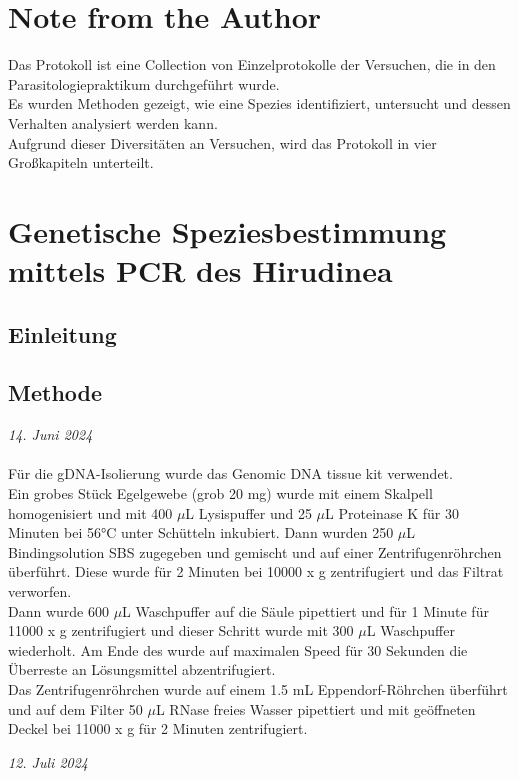 \documentclass[oneside,10pt,a4paper]{report}
\begin{document}
	
	\tableofcontents
	\chapter{Note from the Author}
	Das Protokoll ist eine Collection von Einzelprotokolle der Versuchen, die in den Parasitologiepraktikum durchgeführt wurde.\\
	Es wurden Methoden gezeigt, wie eine Spezies identifiziert, untersucht und dessen Verhalten analysiert werden kann.\\
	Aufgrund dieser Diversitäten an Versuchen, wird das Protokoll in vier Großkapiteln unterteilt.
	
	
	\chapter{Genetische Speziesbestimmung mittels PCR des Hirudinea}	
	\section{Einleitung}
	
	\section{Methode}
	\textit{14. Juni 2024}\\
	\\
	Für die gDNA-Isolierung wurde das Genomic DNA tissue kit verwendet.\\
	Ein grobes Stück Egelgewebe (grob 20 mg) wurde mit einem Skalpell homogenisiert und mit 400 $\mu$L Lysispuffer und 25 $\mu$L Proteinase K für 30 Minuten bei 56°C unter Schütteln inkubiert. Dann wurden 250 $\mu$L Bindingsolution SBS zugegeben und gemischt und auf einer Zentrifugenröhrchen überführt. Diese wurde für 2 Minuten bei 10000 x g zentrifugiert und das Filtrat verworfen.\\
	Dann wurde 600 $\mu$L Waschpuffer auf die Säule pipettiert und für 1 Minute für 11000 x g zentrifugiert und dieser Schritt wurde mit 300 $\mu$L Waschpuffer wiederholt. Am Ende des wurde auf maximalen Speed für 30 Sekunden die Überreste an Lösungsmittel abzentrifugiert.\\
	Das Zentrifugenröhrchen wurde auf einem 1.5 mL Eppendorf-Röhrchen überführt und auf dem Filter 50 $\mu$L RNase freies Wasser pipettiert und mit geöffneten Deckel bei 11000 x g für 2 Minuten zentrifugiert.
	
	\textit{12. Juli 2024}\\
	\\
	
\end{document}
